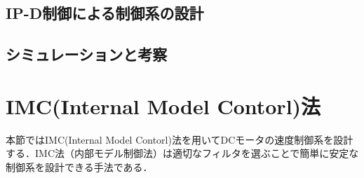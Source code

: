 \documentclass[a4paper,12pt]{jarticle}
\begin{document}
\subsection{IP-D制御による制御系の設計}

\subsection{シミュレーションと考察}


\section{IMC(Internal Model Contorl)法}
本節ではIMC(Internal Model Contorl)法を用いてDCモータの速度制御系を設計
する．IMC法（内部モデル制御法）は適切なフィルタを選ぶことで簡単に安定な
制御系を設計できる手法である．
\end{document}
